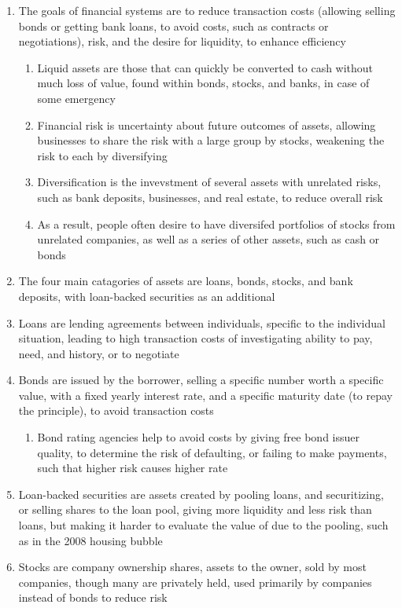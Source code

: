 \begin{enumerate}
\begin{enumerate}
\end{enumerate}
\item The goals of financial systems are to reduce transaction costs (allowing selling bonds or getting bank loans, to avoid costs, such as contracts or negotiations), risk, and the desire for liquidity, to enhance efficiency
\begin{enumerate}
\item Liquid assets are those that can quickly be converted to cash without much loss of value, found within bonds, stocks, and banks, in case of some emergency
\item Financial risk is uncertainty about future outcomes of assets, allowing businesses to share the risk with a large group by stocks, weakening the risk to each by diversifying
\item Diversification is the invevstment of several assets with unrelated risks, such as bank deposits, businesses, and real estate, to reduce overall risk
\item As a result, people often desire to have diversifed portfolios of stocks from unrelated companies, as well as a series of other assets, such as cash or bonds
\end{enumerate}
\item The four main catagories of assets are loans, bonds, stocks, and bank deposits, with loan-backed securities as an additional
\item Loans are lending agreements between individuals, specific to the individual situation, leading to high transaction costs of investigating ability to pay, need, and history, or to negotiate
\item Bonds are issued by the borrower, selling a specific number worth a specific value, with a fixed yearly interest rate, and a specific maturity date (to repay the principle), to avoid transaction costs 
\begin{enumerate}
\item Bond rating agencies help to avoid costs by giving free bond issuer quality, to determine the risk of defaulting, or failing to make payments, such that higher risk causes higher rate
\end{enumerate}
\item Loan-backed securities are assets created by pooling loans, and securitizing, or selling shares to the loan pool, giving more liquidity and less risk than loans, but making it harder to evaluate the value of due to the pooling, such as in the 2008 housing bubble
\item Stocks are company ownership shares, assets to the owner, sold by most companies, though many are privately held, used primarily by companies instead of bonds to reduce risk

\end{enumerate}

